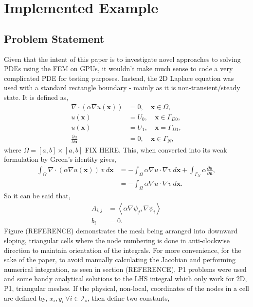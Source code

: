 \section{Implemented Example}

\subsection{Problem Statement}
	Given that the intent of this paper is to investigate novel approaches to solving PDEs using the FEM on GPUs, it wouldn't make much sense to code a very complicated PDE for testing purposes. Instead, the 2D Laplace equation was used with a standard rectangle boundary -  mainly as it is non-transient/steady state. It is defined as,
\begin{align}
	\nabla\cdot(\alpha\nabla u(\mathbf{x})) &= 0,\quad \mathbf{x}\in \Omega, \\
	u(\mathbf{x}) &= U_0,\quad \mathbf{x} \in \Gamma_{D0},\\
	u(\mathbf{x}) &= U_1,\quad \mathbf{x} = \Gamma_{D1},\\
	\frac{\partial u}{\partial \mathbf{n}} &= 0,\quad \mathbf{x} \in {\Gamma_N},
\end{align}
where $\Omega = [a,b]\times[a,b]$ FIX HERE. This, when converted into its weak formulation by Green's identity gives,
\begin{align}
	\int_\Omega \nabla\cdot(\alpha\nabla u(\mathbf{x}))~v~d\mathbf{x} &= -\int_\Omega \alpha\nabla u \cdot \nabla v~d\mathbf{x} + \int_{\Gamma_N} \alpha \frac{\partial u}{\partial \mathbf{n}},\\
	&= -\int_\Omega \alpha\nabla u \cdot \nabla v~d\mathbf{x}.
\end{align}
So it can be said that,
\begin{align}
	A_{i,j} &= \left\langle \alpha \nabla \psi_j, \nabla \psi_i\right\rangle\\
	b_i &= 0.
\end{align}
Figure (REFERENCE) demonstrates the mesh being arranged into downward sloping, triangular cells where the node numbering is done in anti-clockwise direction to maintain orientation of the integrals. For more convenience, for the sake of the paper, to avoid manually calculating the Jacobian and performing numerical integration, as seen in section (REFERENCE), P1 problems were used and some handy analytical solutions to the LHS integral which only work for 2D, P1, triangular meshes. If the physical, non-local, coordinates of the nodes in a cell are defined by, $x_i, y_i~\forall i \in \mathcal{I}_s$, then define two constants,
